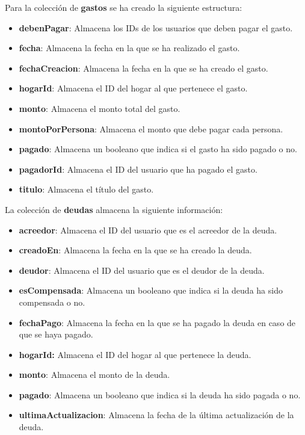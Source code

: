 Para la colección de \textbf{gastos} se ha creado la siguiente estructura:

\begin{itemize}
    \item \textbf{debenPagar}: Almacena los IDs de los usuarios que deben pagar el gasto.
    \item \textbf{fecha}: Almacena la fecha en la que se ha realizado el gasto.
    \item \textbf{fechaCreacion}: Almacena la fecha en la que se ha creado el gasto.
    \item \textbf{hogarId}: Almacena el ID del hogar al que pertenece el gasto.
    \item \textbf{monto}: Almacena el monto total del gasto.
    \item \textbf{montoPorPersona}: Almacena el monto que debe pagar cada persona.
    \item \textbf{pagado}: Almacena un booleano que indica si el gasto ha sido pagado o no.
    \item \textbf{pagadorId}: Almacena el ID del usuario que ha pagado el gasto.
    \item \textbf{titulo}: Almacena el título del gasto.
\end{itemize}

La colección de \textbf{deudas} almacena la siguiente información:

\begin{itemize}
    \item \textbf{acreedor}: Almacena el ID del usuario que es el acreedor de la deuda.
    \item \textbf{creadoEn}: Almacena la fecha en la que se ha creado la deuda.
    \item \textbf{deudor}: Almacena el ID del usuario que es el deudor de la deuda.
    \item \textbf{esCompensada}: Almacena un booleano que indica si la deuda ha sido compensada o no.
    \item \textbf{fechaPago}: Almacena la fecha en la que se ha pagado la deuda en caso de que se haya pagado.
    \item \textbf{hogarId:} Almacena el ID del hogar al que pertenece la deuda.
    \item \textbf{monto}: Almacena el monto de la deuda.
    \item \textbf{pagado}: Almacena un booleano que indica si la deuda ha sido pagada o no.
    \item \textbf{ultimaActualizacion}: Almacena la fecha de la última actualización de la deuda.
\end{itemize}

